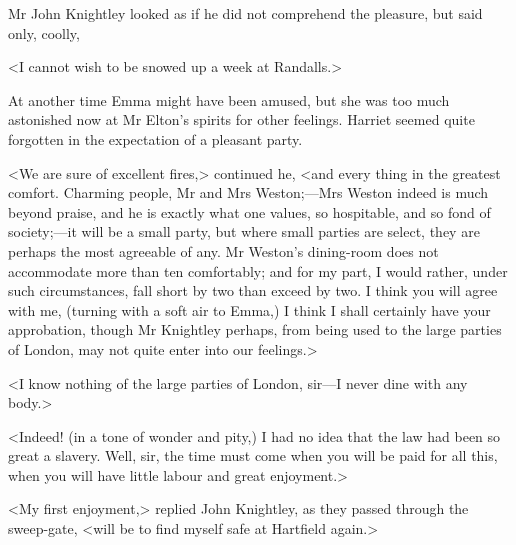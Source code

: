 Mr John Knightley looked as if he did not comprehend the pleasure, but said only, coolly,

<I cannot wish to be snowed up a week at Randalls.>

At another time Emma might have been amused, but she was too much astonished now at Mr Elton's spirits for other feelings. Harriet seemed quite forgotten in the expectation of a pleasant party.

<We are sure of excellent fires,> continued he, <and every thing in the greatest comfort. Charming people, Mr and Mrs Weston;—Mrs Weston indeed is much beyond praise, and he is exactly what one values, so hospitable, and so fond of society;—it will be a small party, but where small parties are select, they are perhaps the most agreeable of any. Mr Weston's dining-room does not accommodate more than ten comfortably; and for my part, I would rather, under such circumstances, fall short by two than exceed by two. I think you will agree with me, (turning with a soft air to Emma,) I think I shall certainly have your approbation, though Mr Knightley perhaps, from being used to the large parties of London, may not quite enter into our feelings.>

<I know nothing of the large parties of London, sir—I never dine with any body.>

<Indeed! (in a tone of wonder and pity,) I had no idea that the law had been so great a slavery. Well, sir, the time must come when you will be paid for all this, when you will have little labour and great enjoyment.>

<My first enjoyment,> replied John Knightley, as they passed through the sweep-gate, <will be to find myself safe at Hartfield again.>